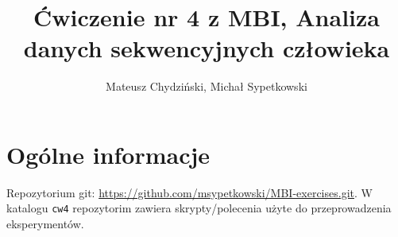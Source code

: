 \documentclass[a4paper]{article}
\begin{document}
\title{Ćwiczenie nr 4 z MBI, Analiza danych sekwencyjnych człowieka}
\author{Mateusz Chydziński, Michał Sypetkowski}
\maketitle

\section{Ogólne informacje}
Repozytorium git: \url{https://github.com/msypetkowski/MBI-exercises.git}.
W katalogu \texttt{cw4} repozytorim zawiera skrypty/polecenia użyte do przeprowadzenia eksperymentów.
\end{document}
